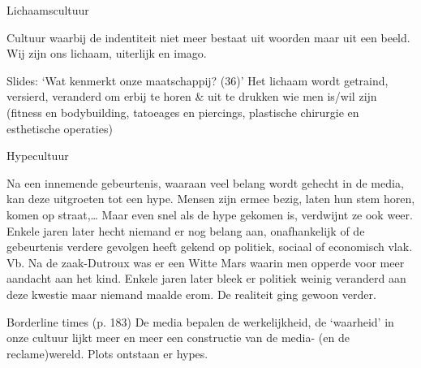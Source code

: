 \documentclass[main.tex]{subfiles}
\begin{document}
\begin{examenvraag}
    \begin{vraag}
        Lichaamscultuur
    \end{vraag}
    \begin{antwoord}
        Cultuur waarbij de indentiteit niet meer bestaat uit woorden maar uit 
        een beeld.‭ ‬Wij zijn ons 	
        lichaam,‭ ‬uiterlijk en imago.
        \begin{citaat}{Slides: `Wat kenmerkt onze maatschappij? (36)'}
            Het lichaam wordt getraind, versierd, veranderd om erbij te horen \& uit te drukken wie men is/wil zijn (fitness en 
            bodybuilding, tatoeages en piercings, plastische chirurgie en esthetische operaties)
        \end{citaat}	
    \end{antwoord}
\end{examenvraag}


\begin{examenvraag}
    \begin{vraag}
        Hypecultuur
    \end{vraag}

    \begin{antwoord}
        Na een innemende gebeurtenis,‭ ‬waaraan veel belang wordt gehecht in de 
        media,‭ ‬kan deze 
        uitgroeten tot een‭ ‬hype.‭ ‬Mensen zijn ermee bezig,‭ ‬laten hun stem 
        horen,‭ ‬komen op straat,‭…‬ 
        Maar even snel als de hype gekomen is,‭ ‬verdwijnt ze ook weer.‭ ‬Enkele 
        jaren later hecht 
        niemand er nog belang aan,‭ ‬onafhankelijk of de gebeurtenis verdere 
        gevolgen heeft gekend op 
        politiek,‭ ‬sociaal of economisch vlak.‭ ‬Vb.‭ ‬Na de zaak-Dutroux was er 
        een Witte Mars waarin 
        men opperde voor meer aandacht aan het kind.‭ ‬Enkele jaren later bleek 
        er politiek weinig 
        veranderd aan deze kwestie maar niemand maalde erom.‭ ‬De realiteit 
        ging gewoon verder.
        \begin{citaat}{Borderline times (p. 183)}
            De media bepalen de werkelijkheid, de `waarheid' in onze cultuur 
            lijkt meer en meer een constructie van de media- (en de 
            reclame)wereld.
            Plots ontstaan er hypes.
        \end{citaat}
    \end{antwoord}
\end{examenvraag}
\end{document}
